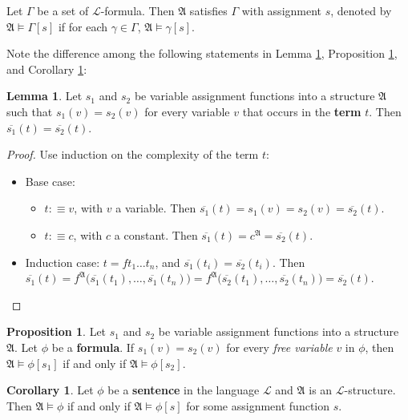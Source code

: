 \documentclass[11pt,letterpaper]{book}
\theoremstyle{definition}
\newtheorem{proposition}{Proposition}[section]
\newtheorem{lemma}{Lemma}[section]
\newtheorem{corollary}{Corollary}[section]
\begin{document}
Let $\Gamma$ be a set of $\mathcal{L}$-formula. Then $\mathfrak{A}$
satisfies $\Gamma$ with assignment $s$, denoted by $\mathfrak{A}\models
\Gamma[s]$ if for each $\gamma \in \Gamma$, $\mathfrak{A} \models
\gamma[s]$.


Note the difference among the following statements in Lemma
\ref{lemma_truth_in_structure_1}, Proposition
\ref{proposition_truth_in_structure_2}, and Corollary
\ref{corollary_truth_in_structure_3}:

\begin{lemma}
Let $s_1$ and $s_2$ be variable assignment functions into a structure
$\mathfrak{A}$ such that $s_1 (v) = s_2 (v)$ for every variable $v$ that
occurs in the \textbf{term} $t$. Then $\overline{s_1} (t) =
\overline{s_2} (t)$.\label{lemma_truth_in_structure_1}
\end{lemma}

\begin{proof}
Use induction on the complexity of the term $t$:
\begin{itemize}
\item{Base case:}
\begin{itemize}
\item{$t :\equiv v$, with $v$ a variable. Then $\overline{s_1} (t) = s_1
(v) = s_2 (v) = \overline{s_2} (t) $.}
\item{$ t: \equiv c$, with $c$ a constant. Then $\overline{s_1} (t) =
c^{\mathfrak{A}} = \overline{s_2} (t)$.}
\end{itemize}
\item{Induction case: $t = f t_1 \ldots t_n$, and $\overline{s_1} (t_i)
= \overline{s_2} (t_i)$.
Then $\overline{s_1} (t) = f^{\mathfrak{A}} \big(  \overline{s_1} (t_1),
\ldots, \overline{s_1} (t_n) \big) = f^{\mathfrak{A}} \big(
\overline{s_2} (t_1), \ldots, \overline{s_2} (t_n) \big)  =
\overline{s_2} (t)$.
}
\end{itemize}
\end{proof}

\begin{proposition}
Let $s_1$ and $s_2$ be variable assignment functions into a structure
$\mathfrak{A}$. Let $\phi$ be a \textbf{formula}. If $s_1 (v) = s_2 (v)$
for every \emph{free variable} $v$ in $\phi$, then $\mathfrak{A} \models
\phi[s_1]$ if and only if $\mathfrak{A} \models
\phi[s_2]$.\label{proposition_truth_in_structure_2}
\end{proposition}

\begin{corollary}
Let $\phi$ be a \textbf{sentence} in the language $\mathcal{L}$ and
$\mathfrak{A}$ is an $\mathcal{L}$-structure. Then $\mathfrak{A}\models
\phi$ if and only if $\mathfrak{A} \models \phi[s]$ for some assignment
function $s$.\label{corollary_truth_in_structure_3}
\end{corollary}
\end{document}
